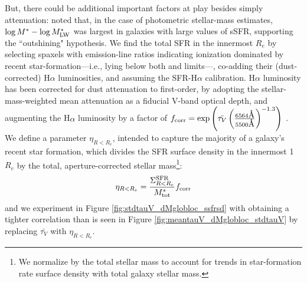 But, there could be additional important factors at play besides simply attenuation: \citet{sorba_sawicki_15} noted that, in the case of photometric stellar-mass estimates, $\log{M^*} - \log{M^*_{\rm LW}}$ was largest in galaxies with large values of sSFR, supporting the ``outshining" hypothesis. We find the total SFR in the innermost $R_e$ by selecting spaxels with emission-line ratios indicating ionization dominated by recent star-formation---i.e., lying below both \citet{kauffmann_03_agn} and \citet{kewley_dopita_01} limits---, co-adding their (dust-corrected) H$\alpha$ luminosities, and assuming the \citet{calzetti_13_sfr_indicators} SFR-H$\alpha$ calibration. H$\alpha$ luminosity has been corrected for dust attenuation to first-order, by adopting the stellar-mass-weighted mean attenuation as a fiducial V-band optical depth, and augmenting the H$\alpha$ luminosity by a factor of $f_{\rm corr} = {\rm exp}\left(\bar{\tau_V} \left(\frac{6564 \mbox{\AA}}{5500\mbox{\AA}}\right)^{-1.3}\right)$ \citep{charlot_fall_00}. We define a parameter $\eta_{R<R_e}$, intended to capture the majority of a galaxy's recent star formation, which divides the SFR surface density in the innermost 1 $R_e$ by the total, aperture-corrected stellar mass\footnote{We normalize by the total stellar mass to account for trends in star-formation rate surface density with total galaxy stellar mass.}:
%
\begin{equation}
    \eta_{R<R_e} = \frac{\Sigma^{\rm SFR}_{R<R_e}}{M^*_{\rm tot}} f_{\rm corr}
\end{equation}
%
and we experiment in Figure \ref{fig:stdtauV_dMglobloc_ssfrsd} with obtaining a tighter correlation than is seen in Figure \ref{fig:meantauV_dMglobloc_stdtauV} by replacing $\bar{\tau_V}$ with $\eta_{R<R_e}$.

